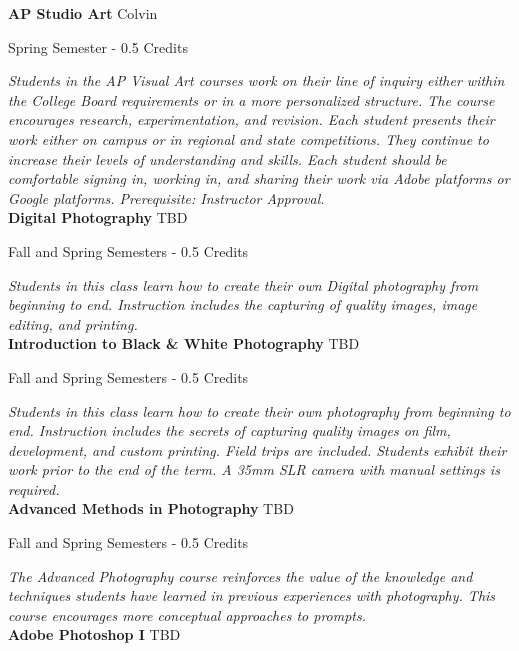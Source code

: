 \noindent\textbf{AP Studio Art} \hfill Colvin

\noindent Spring Semester - 0.5 Credits

\vspace{1mm}\emph{Students in the AP Visual Art courses work on their line of inquiry either within the College Board requirements or in a more personalized structure. The course encourages research, experimentation, and revision. Each student presents their work either on campus or in regional and state competitions. They continue to increase their levels of understanding and skills. Each student should be comfortable signing in, working in, and sharing their work via Adobe platforms or Google platforms. Prerequisite: Instructor Approval.}\\


\noindent\textbf{Digital Photography} \hfill TBD

\noindent Fall and Spring Semesters - 0.5 Credits

\vspace{1mm}\emph{Students in this class learn how to create their own Digital photography from beginning to end. Instruction includes the capturing of quality images, image editing, and printing.}\\


\noindent\textbf{Introduction to Black \& White Photography} \hfill TBD

\noindent Fall and Spring Semesters - 0.5 Credits

\vspace{1mm}\emph{Students in this class learn how to create their own photography from beginning to end. Instruction includes the secrets of capturing quality images on film, development, and custom printing. Field trips are included. Students exhibit their work prior to the end of the term. A 35mm SLR camera with manual settings is required.}\\


\noindent\textbf{Advanced Methods in Photography} \hfill TBD

\noindent Fall and Spring Semesters - 0.5 Credits

\vspace{1mm}\emph{The Advanced Photography course reinforces the value of the knowledge and techniques students have learned in previous experiences with photography.  This course encourages more conceptual approaches to prompts.}\\


\noindent\textbf{Adobe Photoshop I} \hfill TBD

